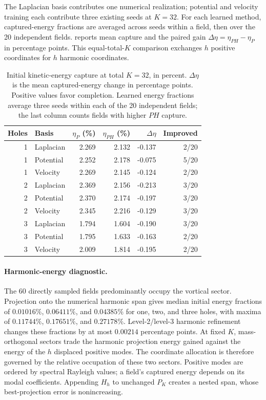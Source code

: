 The Laplacian basis contributes one numerical realization; potential and velocity training each contribute three existing seeds at $K=32$. For each learned method, captured-energy fractions are averaged across seeds within a field, then over the 20 independent fields.  reports mean capture and the paired gain $\Delta\eta=\eta_{PH}-\eta_P$ in percentage points. This equal-total-$K$ comparison exchanges $h$ positive coordinates for $h$ harmonic coordinates.

\begin{table}[!htb]\centering\small
\caption{Initial kinetic-energy capture at total $K=32$, in percent. $\Delta\eta$ is the mean captured-energy change in percentage points. Positive values favor completion. Learned energy fractions average three seeds within each of the 20 independent fields; the last column counts fields with higher $PH$ capture.}
\label{tab:random-paired}
\begin{tabular}{rlrrrr}\toprule
Holes & Basis & $\eta_P$ (\%) & $\eta_{PH}$ (\%) & $\Delta\eta$ & Improved\\\midrule
1&Laplacian&2.269&2.132&-0.137&2/20\\
1&Potential&2.252&2.178&-0.075&5/20\\
1&Velocity&2.269&2.145&-0.124&2/20\\
2&Laplacian&2.369&2.156&-0.213&3/20\\
2&Potential&2.370&2.174&-0.197&3/20\\
2&Velocity&2.345&2.216&-0.129&3/20\\
3&Laplacian&1.794&1.604&-0.190&3/20\\
3&Potential&1.795&1.633&-0.163&2/20\\
3&Velocity&2.009&1.814&-0.195&2/20\\
\bottomrule\end{tabular}\end{table}




\begin{samepage}
\paragraph{Harmonic-energy diagnostic.}
\begingroup
The 60 directly sampled fields predominantly occupy the vortical sector. Projection onto the numerical harmonic span gives median initial energy fractions of $0.01016\%$, $0.06411\%$, and $0.04385\%$ for one, two, and three holes, with maxima of $0.11744\%$, $0.17651\%$, and $0.27178\%$. Level-2/level-3 harmonic refinement changes these fractions by at most $0.00214$ percentage points. At fixed $K$, mass-orthogonal sectors trade the harmonic projection energy gained against the energy of the $h$ displaced positive modes. The coordinate allocation is therefore governed by the relative occupation of these two sectors. Positive modes are ordered by spectral Rayleigh values; a field's captured energy depends on its modal coefficients. Appending $H_h$ to unchanged $P_K$ creates a nested span, whose best-projection error is nonincreasing.
\par\endgroup
\par
\end{samepage}

